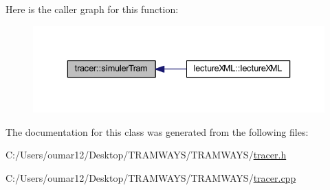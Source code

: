 Here is the caller graph for this function\+:
\nopagebreak
\begin{figure}[H]
\begin{center}
\leavevmode
\includegraphics[width=336pt]{classtracer_a1ac543894333a48a09a1a423d33b20a5_icgraph}
\end{center}
\end{figure}




The documentation for this class was generated from the following files\+:\begin{DoxyCompactItemize}
\item 
C\+:/\+Users/oumar12/\+Desktop/\+T\+R\+A\+M\+W\+A\+Y\+S/\+T\+R\+A\+M\+W\+A\+Y\+S/\hyperlink{tracer_8h}{tracer.\+h}\item 
C\+:/\+Users/oumar12/\+Desktop/\+T\+R\+A\+M\+W\+A\+Y\+S/\+T\+R\+A\+M\+W\+A\+Y\+S/\hyperlink{tracer_8cpp}{tracer.\+cpp}\end{DoxyCompactItemize}
